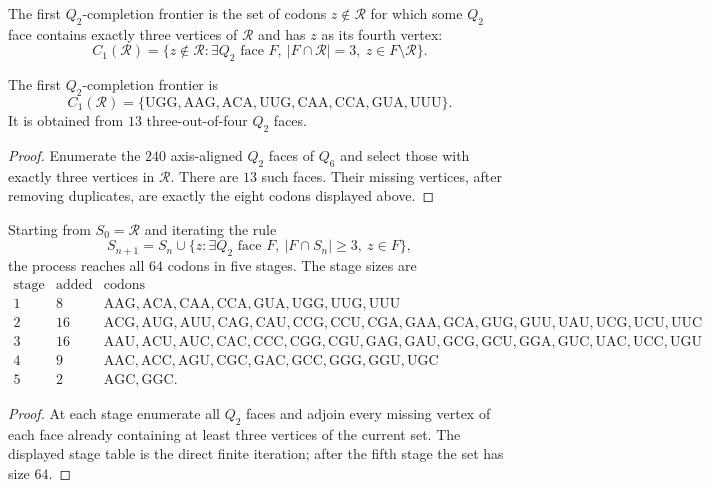 \begin{definition}
\label{def:philosophy-q2-completion-frontier}
The first $Q_{2}$-completion frontier is the set of codons
$z\notin\mathcal{R}$ for which some $Q_{2}$ face contains exactly
three vertices of $\mathcal{R}$ and has $z$ as its fourth vertex:
$$
  C_{1}(\mathcal{R})
  =
  \{z\notin\mathcal{R}:\exists Q_{2}\text{ face }F,\ 
    |F\cap\mathcal{R}|=3,\ z\in F\setminus\mathcal{R}\}.
$$
\end{definition}

\begin{theorem}
\label{thm:philosophy-first-completion-frontier}
The first $Q_{2}$-completion frontier is
$$
  C_{1}(\mathcal{R})
  =
  \{\mathrm{UGG},\mathrm{AAG},\mathrm{ACA},\mathrm{UUG},
    \mathrm{CAA},\mathrm{CCA},\mathrm{GUA},\mathrm{UUU}\}.
$$
It is obtained from $13$ three-out-of-four $Q_{2}$ faces.
\end{theorem}
\begin{proof}
Enumerate the $240$ axis-aligned $Q_{2}$ faces of $Q_{6}$ and select
those with exactly three vertices in $\mathcal{R}$. There are $13$ such
faces. Their missing vertices, after removing duplicates, are exactly
the eight codons displayed above.
\end{proof}

\begin{theorem}
\label{thm:philosophy-q2-completion-percolation}
Starting from $S_{0}=\mathcal{R}$ and iterating the rule
$$
  S_{n+1}
  =
  S_{n}\cup
  \{z:\exists Q_{2}\text{ face }F,\ |F\cap S_{n}|\ge 3,\ z\in F\},
$$
the process reaches all $64$ codons in five stages. The stage sizes are
$$
\begin{array}{c|c|l}
  \text{stage} & \text{added} & \text{codons}\\
  \hline
  1 & 8 &
    \mathrm{AAG},\mathrm{ACA},\mathrm{CAA},\mathrm{CCA},
    \mathrm{GUA},\mathrm{UGG},\mathrm{UUG},\mathrm{UUU}\\
  2 & 16 &
    \mathrm{ACG},\mathrm{AUG},\mathrm{AUU},\mathrm{CAG},
    \mathrm{CAU},\mathrm{CCG},\mathrm{CCU},\mathrm{CGA},
    \mathrm{GAA},\mathrm{GCA},\mathrm{GUG},\mathrm{GUU},
    \mathrm{UAU},\mathrm{UCG},\mathrm{UCU},\mathrm{UUC}\\
  3 & 16 &
    \mathrm{AAU},\mathrm{ACU},\mathrm{AUC},\mathrm{CAC},
    \mathrm{CCC},\mathrm{CGG},\mathrm{CGU},\mathrm{GAG},
    \mathrm{GAU},\mathrm{GCG},\mathrm{GCU},\mathrm{GGA},
    \mathrm{GUC},\mathrm{UAC},\mathrm{UCC},\mathrm{UGU}\\
  4 & 9 &
    \mathrm{AAC},\mathrm{ACC},\mathrm{AGU},\mathrm{CGC},
    \mathrm{GAC},\mathrm{GCC},\mathrm{GGG},\mathrm{GGU},
    \mathrm{UGC}\\
  5 & 2 &
    \mathrm{AGC},\mathrm{GGC}.
\end{array}
$$
\end{theorem}
\begin{proof}
At each stage enumerate all $Q_{2}$ faces and adjoin every missing
vertex of each face already containing at least three vertices of the
current set. The displayed stage table is the direct finite iteration;
after the fifth stage the set has size $64$.
\end{proof}

